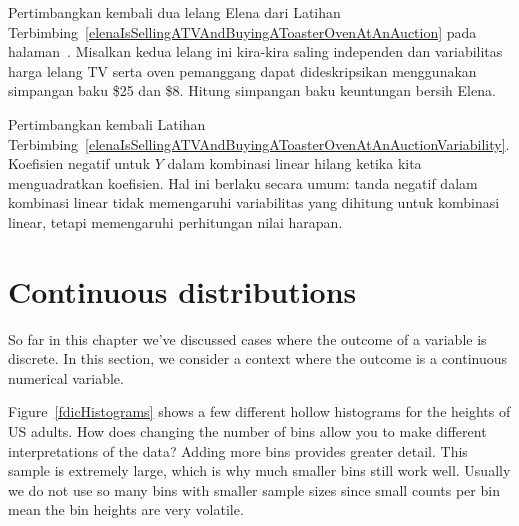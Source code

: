\begin{exercisewrap}
\begin{nexercise}\label{elenaIsSellingATVAndBuyingAToasterOvenAtAnAuctionVariability}
Pertimbangkan kembali dua lelang Elena dari Latihan Terbimbing~\ref{elenaIsSellingATVAndBuyingAToasterOvenAtAnAuction} pada halaman~\pageref{elenaIsSellingATVAndBuyingAToasterOvenAtAnAuction}. Misalkan kedua lelang ini kira-kira saling independen dan variabilitas harga lelang TV serta oven pemanggang dapat dideskripsikan menggunakan simpangan baku \$25 dan \$8. Hitung simpangan baku keuntungan bersih Elena.\footnotemark
\end{nexercise}
\end{exercisewrap}

Pertimbangkan kembali Latihan Terbimbing~\ref{elenaIsSellingATVAndBuyingAToasterOvenAtAnAuctionVariability}. Koefisien negatif untuk $Y$ dalam kombinasi linear hilang ketika kita menguadratkan koefisien. Hal ini berlaku secara umum: tanda negatif dalam kombinasi linear tidak memengaruhi variabilitas yang dihitung untuk kombinasi linear, tetapi memengaruhi perhitungan nilai harapan.



{}





\section{Continuous distributions}
\label{contDist}

\noindent%
So far in this chapter we've discussed cases
where the outcome of a variable is discrete.
In this section, we consider a context where
the outcome is a continuous numerical variable.

\begin{examplewrap}
\begin{nexample}{Figure~\ref{fdicHistograms} shows a few
    different hollow histograms for the heights of US adults.
    How does changing the number of bins allow you to make
    different interpretations of the data?}
  \label{usHeights}%
  Adding more bins provides greater detail.
  This sample is extremely large, which is why much smaller
  bins still work well.
  Usually we do not use so many bins with smaller sample
  sizes since small counts per bin mean the bin heights
  are very volatile.
\end{nexample}
\end{examplewrap}

